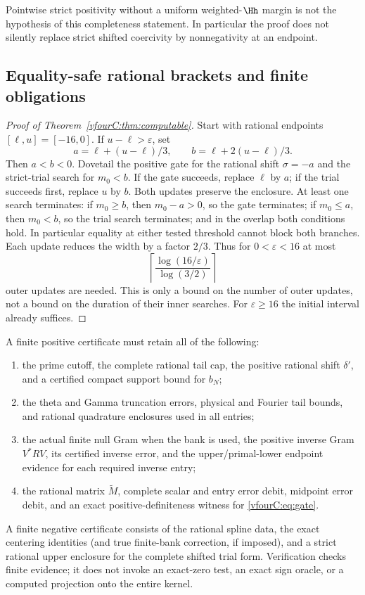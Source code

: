 Pointwise strict positivity without a uniform weighted-$\Hh$ margin is not the
hypothesis of this completeness statement.  In particular the proof does not
silently replace strict shifted coercivity by nonnegativity at an endpoint.

\subsection{Equality-safe rational brackets and finite obligations}
\label{vfourC:subsec:brackets}

\begin{proof}[Proof of Theorem~\ref{vfourC:thm:computable}]
Start with rational endpoints $[\ell,u]=[-16,0]$.  If $u-\ell>\varepsilon$, set
\[
 a=\ell+(u-\ell)/3,\qquad b=\ell+2(u-\ell)/3.
\]
Then $a<b<0$.  Dovetail the positive gate for the rational shift $\sigma=-a$
and the strict-trial search for $m_0<b$.  If the gate succeeds, replace
$\ell$ by $a$; if the trial succeeds first, replace $u$ by $b$.
Both updates preserve the enclosure.  At least one search terminates:
if $m_0\ge b$, then $m_0-a>0$, so the gate terminates; if $m_0\le a$, then
$m_0<b$, so the trial search terminates; and in the overlap both conditions
hold.  In particular equality at either tested threshold cannot block both
branches.  Each update reduces the width by a factor $2/3$.  Thus for
$0<\varepsilon<16$ at most
\[
 \left\lceil\frac{\log(16/\varepsilon)}{\log(3/2)}\right\rceil
\]
outer updates are needed.  This is only a bound on the number of outer updates,
not a bound on the duration of their inner searches.  For $\varepsilon\ge16$
the initial interval already suffices.
\end{proof}

A finite positive certificate must retain all of the following:
\begin{enumerate}[label=(\roman*)]
 \item the prime cutoff, the complete rational tail cap, the positive rational
       shift $\delta'$, and a certified compact support bound for $b_N$;
 \item the theta and Gamma truncation errors, physical and Fourier tail bounds,
       and rational quadrature enclosures used in all entries;
 \item the actual finite null Gram when the bank is used, the positive inverse
       Gram $V^*RV$, its certified inverse error, and the upper/primal-lower
       endpoint evidence for each required inverse entry;
 \item the rational matrix $\widetilde M$, complete scalar and entry error
       debit, midpoint error debit, and an exact positive-definiteness witness
       for \eqref{vfourC:eq:gate}.
\end{enumerate}
A finite negative certificate consists of the rational spline data, the exact
centering identities (and true finite-bank correction, if imposed), and a
strict rational upper enclosure for the complete shifted trial form.
Verification checks finite evidence; it does not invoke an exact-zero test,
an exact sign oracle, or a computed projection onto the entire kernel.


